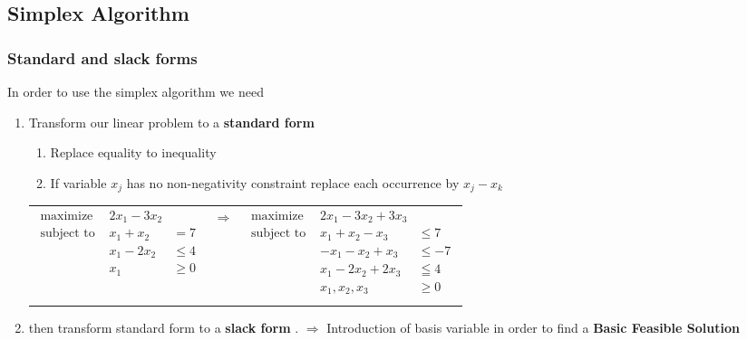 \subsection{Simplex Algorithm}

\subsubsection{Standard and slack forms}
In order to use the simplex algorithm we need 
\begin{enumerate}
    \item Transform our linear problem  to  a \textbf{standard form}
        \begin{enumerate} 
            \item Replace equality to inequality
            \item If variable $x_j$ has no non-negativity
                constraint replace
                each occurrence by $x_j - x_k$
        \end{enumerate}
\begin{scriptsize}
        \begin{tabular}{m{7cm}cm{7cm}}
            \begin{eqnarray*}
                \textrm{maximize } & 2x_1 - 3x_2\\
                \textrm{subject to } & x_1 + x_2 &= 7\\
                                     & x_1 - 2x_2 &\leq 4 \\
                                     & x_1 &\geq 0\\
            \end{eqnarray*}
            & $\Rightarrow$ &
            \begin{eqnarray*}
                \textrm{maximize } & 2x_1 - 3x_2 + 3x_3\\
                \textrm{subject to } & x_1 + x_2 - x_3 & \leq 7\\
                                     & -x_1 - x_2 + x_3 & \leq -7  \\
                                     & x_1 - 2x_2 + 2x_3 & \leqq 4 \\
                                     & x_1, x_2, x_3 & \geq 0\\
            \end{eqnarray*}
        \end{tabular}
\end{scriptsize}

    \item then transform standard form to a \textbf{slack form }.
        $\Rightarrow$  Introduction of basis variable in order to find a 
        \textbf{Basic Feasible Solution}


\end{enumerate}
